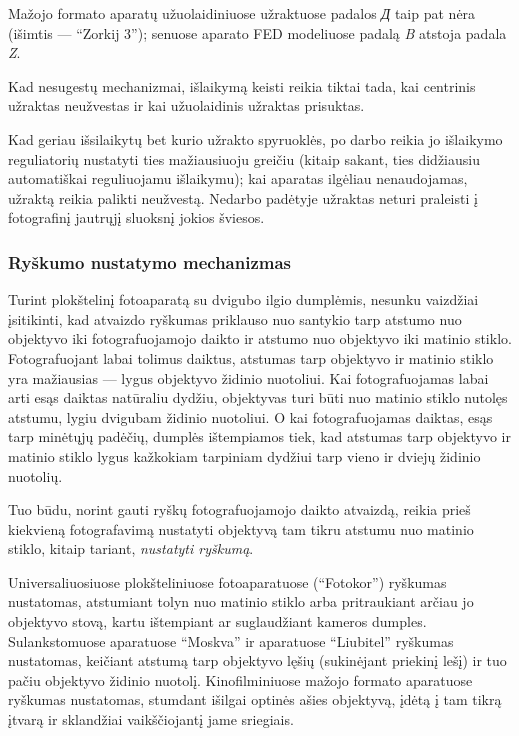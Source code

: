 \documentclass[12pt]{book}
\begin{document}
					Mažojo formato aparatų užuolaidiniuose užraktuose padalos \textit{\foreignlanguage{russian}{Д}} taip pat nėra (išimtis --- ``Zorkij 3''); senuose aparato FED modeliuose padalą \textit{B} atstoja padala \textit{Z}.

					Kad nesugestų mechanizmai, išlaikymą keisti reikia tiktai tada, kai centrinis užraktas neužvestas ir kai užuolaidinis užraktas prisuktas.

					Kad geriau išsilaikytų bet kurio užrakto spyruoklės, po darbo reikia jo išlaikymo reguliatorių nustatyti ties mažiausiuoju greičiu (kitaip sakant, ties didžiausiu automatiškai reguliuojamu išlaikymu); kai aparatas ilgėliau nenaudojamas, užraktą reikia palikti neužvestą. Nedarbo padėtyje užraktas neturi praleisti į fotografinį jautrųjį sluoksnį jokios šviesos.
				\subsubsection*{Ryškumo nustatymo mechanizmas}
					Turint plokštelinį fotoaparatą su dvigubo ilgio dumplėmis, nesunku vaizdžiai įsitikinti, kad atvaizdo ryškumas priklauso nuo santykio tarp atstumo nuo objektyvo iki fotografuojamojo daikto ir atstumo nuo objektyvo iki matinio stiklo. Fotografuojant labai tolimus daiktus, atstumas tarp objektyvo ir matinio stiklo yra mažiausias --- lygus objektyvo židinio nuotoliui. Kai fotografuojamas labai arti esąs daiktas natūraliu dydžiu, objektyvas turi būti nuo matinio stiklo nutolęs atstumu, lygiu dvigubam židinio nuotoliui. O kai fotografuojamas daiktas, esąs tarp minėtųjų padėčių, dumplės ištempiamos tiek, kad atstumas tarp objektyvo ir matinio stiklo lygus kažkokiam tarpiniam dydžiui tarp vieno ir dviejų židinio nuotolių.

					Tuo būdu, norint gauti ryškų fotografuojamojo daikto atvaizdą, reikia prieš kiekvieną fotografavimą nustatyti objektyvą tam tikru atstumu nuo matinio stiklo, kitaip tariant, \textit{nustatyti ryškumą}.

					Universaliuosiuose plokšteliniuose fotoaparatuose (``Fotokor'') ryškumas nustatomas, atstumiant tolyn nuo matinio stiklo arba pritraukiant arčiau jo objektyvo stovą, kartu ištempiant ar suglaudžiant kameros dumples. Sulankstomuose aparatuose ``Moskva'' ir aparatuose ``Liubitel'' ryškumas nustatomas, keičiant atstumą tarp objektyvo lęšių (sukinėjant priekinį lešį) ir tuo pačiu objektyvo židinio nuotolį. Kinofilminiuose mažojo formato aparatuose ryškumas nustatomas, stumdant išilgai optinės ašies objektyvą, įdėtą į tam tikrą įtvarą ir sklandžiai vaikščiojantį jame sriegiais.
\end{document}
